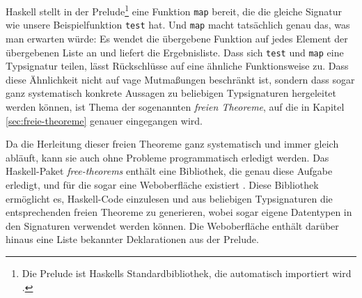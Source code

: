 Haskell stellt in der Prelude\footnote{Die Prelude ist Haskells Standardbibliothek, die automatisch importiert wird \cite{haskell}.}
eine Funktion \texttt{map} bereit, die die gleiche Signatur wie unsere Beispielfunktion \texttt{test} hat. Und \texttt{map} macht tatsächlich genau das, was
man erwarten würde: Es wendet die übergebene Funktion auf jedes Element der übergebenen Liste an und liefert die Ergebnisliste.
Dass sich \texttt{test} und
\texttt{map} eine Typsignatur teilen, lässt Rückschlüsse auf eine ähnliche Funktionsweise zu. Dass diese Ähnlichkeit
nicht auf vage Mutmaßungen beschränkt ist, sondern dass sogar ganz systematisch konkrete Aussagen zu beliebigen Typsignaturen
hergeleitet werden können, ist Thema der sogenannten \textit{freien Theoreme}, auf die in Kapitel \ref{sec:freie-theoreme}
genauer eingegangen wird.

Da die Herleitung dieser freien Theoreme ganz systematisch und immer gleich abläuft, kann sie auch ohne Probleme
programmatisch erledigt werden. Das Haskell-Paket \textit{free-theorems} \cite{freetheorems} enthält eine Bibliothek, die
genau diese Aufgabe erledigt, und für die sogar eine Weboberfläche existiert \cite{freetheoremswebui}.
Diese Bibliothek ermöglicht es, Haskell-Code einzulesen und aus beliebigen Typsignaturen die entsprechenden freien
Theoreme zu generieren, wobei sogar eigene Datentypen in den Signaturen verwendet werden können.
Die Web\-ober\-flä\-che enthält darüber hinaus  eine Liste bekannter Deklarationen aus der Prelude.



